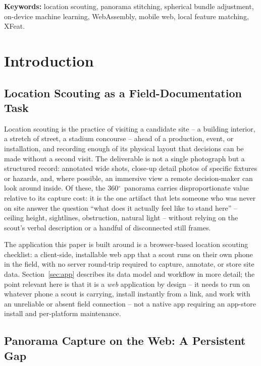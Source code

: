 \documentclass[11pt]{article}
\newcommand{\Deg}{\ensuremath{^{\circ}}}
\begin{document}
\noindent\textbf{Keywords:} location scouting, panorama stitching, spherical bundle adjustment, on-device machine learning, WebAssembly, mobile web, local feature matching, XFeat.

\tableofcontents
\newpage

\section{Introduction}

\subsection{Location Scouting as a Field-Documentation Task}

Location scouting is the practice of visiting a candidate site -- a building interior, a stretch of street, a stadium concourse -- ahead of a production, event, or installation, and recording enough of its physical layout that decisions can be made without a second visit. The deliverable is not a single photograph but a structured record: annotated wide shots, close-up detail photos of specific fixtures or hazards, and, where possible, an immersive view a remote decision-maker can look around inside. Of these, the 360\Deg\ panorama carries disproportionate value relative to its capture cost: it is the one artifact that lets someone who was never on site answer the question ``what does it actually feel like to stand here'' -- ceiling height, sightlines, obstruction, natural light -- without relying on the scout's verbal description or a handful of disconnected still frames.

The application this paper is built around is a browser-based location scouting checklist: a client-side, installable web app that a scout runs on their own phone in the field, with no server round-trip required to capture, annotate, or store site data. Section~\ref{sec:app} describes its data model and workflow in more detail; the point relevant here is that it is a \emph{web} application by design -- it needs to run on whatever phone a scout is carrying, install instantly from a link, and work with an unreliable or absent field connection -- not a native app requiring an app-store install and per-platform maintenance.

\subsection{Panorama Capture on the Web: A Persistent Gap}
\label{sec:gap}
\end{document}
